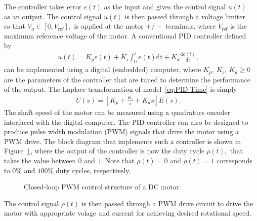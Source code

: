 The controller takes error $e(t)$ as the input and gives the control signal $u(t)$ as an output. The control signal $u(t)$ is then passed through a voltage limiter so that $V_a\in[0,V_{\mathrm{ref}}],$ is applied at the motor $+/-$ terminals, where $V_{\mathrm{ref}}$ is the maximum reference voltage of the motor. A conventional PID controller defined by %
%
\begin{align}
  u(t) = K_pe(t) + K_i\int_0^te(t)\mathrm{dt} + K_d\frac{\mathrm{d}e(t)}{\mathrm{dt}},
  \label{eq:PID-Time}
\end{align}
%
can be implemented using a digital (embedded) computer, where $K_p,~K_i,~K_d\ge 0$ are the parameters of the controller that are tuned to determine the performance of the output.  The Laplace transformation of model~\eqref{eq:PID-Time} is simply %
%
\begin{align}
  U(s) = \left[K_p+\frac{K_i}{s} + K_d s\right]E(s).
  \label{eq:PID-Laplace}
\end{align}
%
The shaft speed of the motor can be measured using a quadrature encoder interfaced with the digital computer.   The PID controller can also be designed to produce pulse width modulation (PWM)  signals that drive the motor using a PWM drive. The block diagram that implements such a controller is shown in Figure~\ref{fig:dcMotorElecMechNoLoadPWM-Control}, where the output of the controller is now the duty cycle $\rho(t),$ that takes the value between $0$ and $1.$ Note that  $\rho(t) = 0$ and  $\rho(t) = 1$ corresponds to $0\%$ and $100\%$ duty cycles, respectively. %
%
\begin{figure}
  \centering
\caption{Closed-loop PWM control structure of a DC motor.}
\label{fig:dcMotorElecMechNoLoadPWM-Control}
\end{figure}
%
The control signal $\rho(t)$ is then passed through a PWM drive circuit to drive the motor with appropriate volage and current for achieving desired rotational speed. %
%

